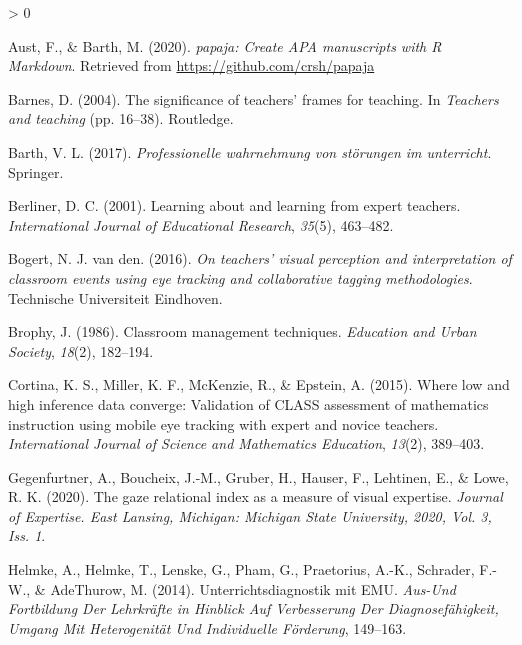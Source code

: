 \documentclass[
  english,
  man,floatsintext]{apa6}
\newlength{\cslhangindent}
\newenvironment{CSLReferences}[2] %
 {%
  \setlength{\parindent}{0pt}
  \ifodd #1 \everypar{\setlength{\hangindent}{\cslhangindent}}\ignorespaces\fi
  \ifnum #2 > 0
  \setlength{\parskip}{#2\baselineskip}
  \fi
 }%
 {}
\begin{document}
\hypertarget{refs}{}
\begin{CSLReferences}{1}{0}
\leavevmode\hypertarget{ref-R-papaja}{}%
Aust, F., \& Barth, M. (2020). \emph{{papaja}: {Create} {APA} manuscripts with {R Markdown}}. Retrieved from \url{https://github.com/crsh/papaja}

\leavevmode\hypertarget{ref-barnes2004significance}{}%
Barnes, D. (2004). The significance of teachers' frames for teaching. In \emph{Teachers and teaching} (pp. 16--38). Routledge.

\leavevmode\hypertarget{ref-barth2017professionelle}{}%
Barth, V. L. (2017). \emph{Professionelle wahrnehmung von störungen im unterricht}. Springer.

\leavevmode\hypertarget{ref-berliner2001learning}{}%
Berliner, D. C. (2001). Learning about and learning from expert teachers. \emph{International Journal of Educational Research}, \emph{35}(5), 463--482.

\leavevmode\hypertarget{ref-bogert2016visualperception}{}%
Bogert, N. J. van den. (2016). \emph{On teachers' visual perception and interpretation of classroom events using eye tracking and collaborative tagging methodologies}. Technische Universiteit Eindhoven.

\leavevmode\hypertarget{ref-brophy1986classroom}{}%
Brophy, J. (1986). Classroom management techniques. \emph{Education and Urban Society}, \emph{18}(2), 182--194.

\leavevmode\hypertarget{ref-cortina2015low}{}%
Cortina, K. S., Miller, K. F., McKenzie, R., \& Epstein, A. (2015). Where low and high inference data converge: Validation of CLASS assessment of mathematics instruction using mobile eye tracking with expert and novice teachers. \emph{International Journal of Science and Mathematics Education}, \emph{13}(2), 389--403.

\leavevmode\hypertarget{ref-gegenfurtner2020gaze}{}%
Gegenfurtner, A., Boucheix, J.-M., Gruber, H., Hauser, F., Lehtinen, E., \& Lowe, R. K. (2020). The gaze relational index as a measure of visual expertise. \emph{Journal of Expertise. East Lansing, Michigan: Michigan State University, 2020, Vol. 3, Iss. 1}.

\leavevmode\hypertarget{ref-helmke2014unterrichtsdiagnostik}{}%
Helmke, A., Helmke, T., Lenske, G., Pham, G., Praetorius, A.-K., Schrader, F.-W., \& AdeThurow, M. (2014). Unterrichtsdiagnostik mit EMU. \emph{Aus-Und Fortbildung Der Lehrkr{ä}fte in Hinblick Auf Verbesserung Der Diagnosef{ä}higkeit, Umgang Mit Heterogenit{ä}t Und Individuelle F{ö}rderung}, 149--163.


\end{CSLReferences}
\end{document}

